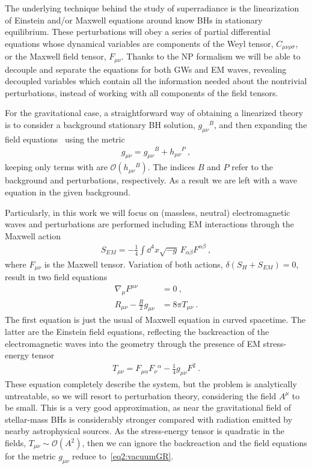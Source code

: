The underlying technique behind the study of superradiance is the linearization of Einstein and/or Maxwell equations around know BHs in stationary equilibrium.
These perturbations will obey a series of partial differential equations whose dynamical variables are components of the Weyl tensor, $C_{\mu\nu\rho\sigma}$, or the Maxwell field tensor, $F_{\mu\nu}$.
Thanks to the NP formalism we will be able to decouple and separate the equations for both GWs and EM waves, revealing decoupled variables which contain all the information needed about the nontrivial perturbations, instead of working with all components of the field tensors.

For the gravitational case, a straightforward way of obtaining a linearized theory is to consider a background stationary BH solution, $g_{\mu\nu}{}^B$, and then expanding the field equations~ using the metric 
\begin{align}
    g_{\mu\nu} = g_{\mu\nu}{}^B + h_{\mu\nu}{}^P ~,
    \label{eq2:metricBP}
\end{align}
keeping only terms with are $\mathcal{O}(h_{\mu\nu}{}^B)$. The indices $B$ and $P$ refer to the background and perturbations, respectively. As a result we are left with a wave equation in the given background. 

Particularly, in this work we will focus on (massless, neutral) electromagnetic waves and perturbations are performed including EM interactions through the Maxwell action
\begin{align}
    S_{EM} = - \frac{1}{4} \int \dd^4 x \sqrt{-g} \,F_{\alpha\beta} F^{\alpha\beta} ~,
     \label{eq2:actionEM}
\end{align}
where $F_{\mu\nu}$ is the Maxwell tensor.
Variation of both actions, $\delta(S_H + S_{EM}) = 0$, result in two field equations
\begin{align}
    \nabla_\mu F^{\mu\nu} &= 0 ~, \label{eq2:maxwellEM} \\
    R_{\mu\nu} - \frac{R}{2} g_{\mu\nu} &= 8 \pi T_{\mu\nu} \label{eq2:EM+GR}  ~.
\end{align}
The first equation is just the usual of Maxwell equation in curved spacetime.
The latter are the Einstein field equations, reflecting the backreaction of the electromagnetic waves into the geometry through the presence of EM stress-energy tensor
\begin{align}
    T_{\mu\nu} = F_{\mu\alpha} F_{\nu}{}^{\alpha} - \frac{1}{4} g_{\mu\nu} F^2  ~.
    \label{eq2:stressenergyEM}
\end{align}
These equation completely describe the system, but the problem is analytically untreatable, so we will resort to perturbation theory, considering the field $A^\mu$ to be small. 
This is a very good approximation, as near the gravitational field of stellar-mass BHs is considerably stronger compared with radiation emitted by nearby astrophysical sources.
As the stress-energy tensor is quadratic in the fields, $T_{\mu\nu}\sim\mathcal{O}(A^2)$, then we can ignore the backreaction and the field equations for the metric $g_{\mu\nu}$ reduce to~\eqref{eq2:vacuumGR}.



